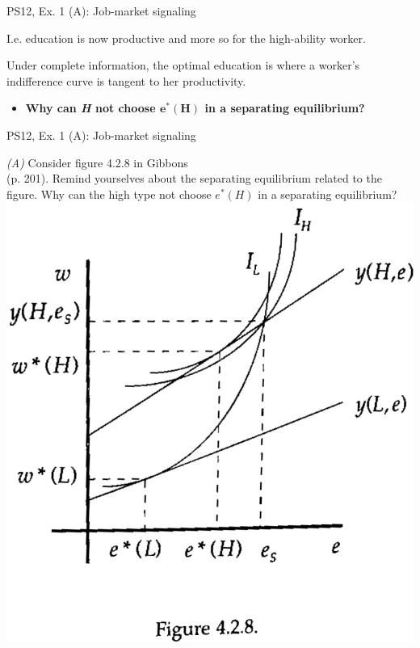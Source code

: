 \begin{frame}{PS12, Ex. 1 (A): Job-market signaling}
\begin{multicols}{2}
\begin{itemize}
        I.e. education is now productive and more so for the high-ability worker.
      \end{itemize}\vspace{-6pt}
      Under complete information, the optimal education is where a worker's indifference curve is tangent to her productivity.\vspace{-6pt}
      \begin{itemize}
        \item[Step 2:] \textbf{Why can \textit{H} not choose $\bm{e^*(H)}$ in a separating equilibrium?}
      \end{itemize}
      \vfill\null
    \end{multicols}
\end{frame}
\begin{frame}{PS12, Ex. 1 (A): Job-market signaling}
    \begin{multicols}{2}
      \textit{(A)} Consider figure 4.2.8 in Gibbons\\
      (p. 201). Remind yourselves about the separating equilibrium related to the figure. Why can the high type not choose $e^*(H)$ in a separating equilibrium?\vspace{8pt}
      \includegraphics[width=\columnwidth]{figures/Gibbons428}

\end{multicols}
\end{frame}
